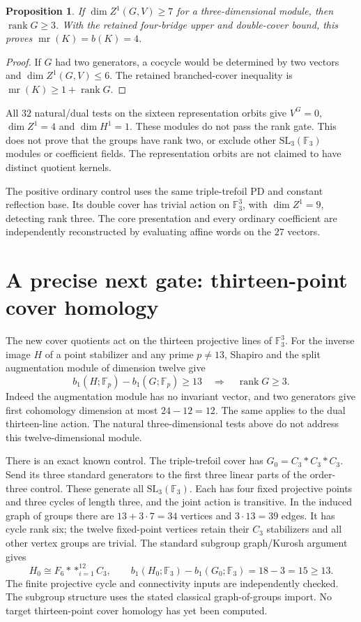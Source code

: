 \documentclass[11pt]{article}
\newtheorem{proposition}{Proposition}
\newcommand{\mr}{\operatorname{mr}}
\newcommand{\rank}{\operatorname{rank}}
\newcommand{\F}{\mathbb F}
\begin{document}
\begin{proposition}
If $\dim Z^1(G,V)\ge7$ for a three-dimensional module, then
$\rank G\ge3$. With the retained four-bridge upper and
double-cover bound, this proves $\mr(K)=b(K)=4$.
\end{proposition}
\begin{proof}
If $G$ had two generators, a cocycle would be determined by
two vectors and $\dim Z^1(G,V)\le6$. The retained branched-cover
inequality is $\mr(K)\ge1+\rank G$.
\end{proof}

All $32$ natural/dual tests on the sixteen representation
orbits give $V^G=0$, $\dim Z^1=4$ and $\dim H^1=1$.
These modules do not pass the rank gate. This does not prove
that the groups have rank two, or exclude other
$\mathrm{SL}_3(\F_3)$ modules or coefficient fields.
The representation orbits are not claimed to have distinct
quotient kernels.

The positive ordinary control uses the same triple-trefoil
PD and constant reflection base. Its double cover has trivial
action on $\F_3^3$, with $\dim Z^1=9$, detecting rank three.
The core presentation and every ordinary coefficient are
independently reconstructed by evaluating affine words on
the $27$ vectors.

\section{A precise next gate: thirteen-point cover homology}

The new cover quotients act on the thirteen projective lines
of $\F_3^3$. For the inverse image $H$ of a point stabilizer
and any prime $p\ne13$, Shapiro and the split augmentation
module of dimension twelve give
\[
 b_1(H;\F_p)-b_1(G;\F_p)\ge13
          \quad\Longrightarrow\quad\rank G\ge3.
\]
Indeed the augmentation module has no invariant vector, and
two generators give first cohomology dimension at most
$24-12=12$. The same applies to the dual thirteen-line action.
The natural three-dimensional tests above do not address
this twelve-dimensional module.

There is an exact known control. The triple-trefoil cover has
$G_0=C_3*C_3*C_3$. Send its three standard generators to the
first three linear parts of the order-three control. These
generate all $\mathrm{SL}_3(\F_3)$. Each has four fixed
projective points and three cycles of length three, and the
joint action is transitive. In the induced graph of groups
there are $13+3\cdot7=34$ vertices and $3\cdot13=39$ edges.
It has cycle rank six; the twelve fixed-point vertices retain
their $C_3$ stabilizers and all other vertex groups are
trivial. The standard subgroup graph/Kurosh argument
\cite[Chapter I]{serre} gives
\[
 H_0\cong F_6*\mathop{*}_{i=1}^{12}C_3,\qquad
 b_1(H_0;\F_3)-b_1(G_0;\F_3)=18-3=15\ge13.
\]
The finite projective cycle and connectivity inputs are
independently checked. The subgroup structure uses the stated
classical graph-of-groups import. No target thirteen-point
cover homology has yet been computed.
\end{document}
